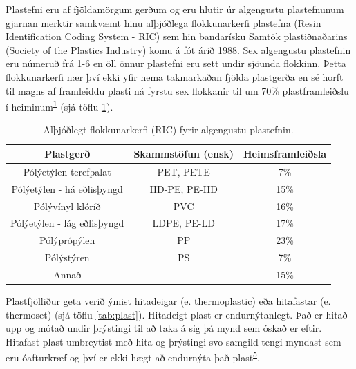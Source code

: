 \documentclass[icelandic,]{book}
\begin{document}
Plastefni eru af fjöldamörgum gerðum og eru hlutir úr algengustu plastefnunum gjarnan merktir samkvæmt hinu alþjóðlega flokkunarkerfi plastefna (Resin Identification Coding System - RIC) sem hin bandarísku Samtök plastiðnaðarins (Society of the Plastics Industry) komu á fót árið 1988. Sex algengustu plastefnin eru númeruð frá 1-6 en öll önnur plastefni eru sett undir sjöunda flokkinn. Þetta flokkunarkerfi nær því ekki yfir nema takmarkaðan fjölda plastgerða en sé horft til magns af framleiddu plasti ná fyrstu sex flokkanir til um 70\% plastframleiðslu í heiminum\textsuperscript{\protect\hyperlink{ref-geyer2017production}{1}} (sjá töflu \ref{tab:framleidsla}).

\begin{table}[t]

\caption{\label{tab:framleidsla}Alþjóðlegt flokkunarkerfi (RIC) fyrir algengustu plastefnin.}
\centering
\begin{tabular}{ccc}
\toprule
Plastgerð & Skammstöfun (ensk) & Heimsframleiðsla\\
\midrule
\rowcolor{gray!6} Pólýetýlen terefþalat & PET, PETE & 7\%\\
Pólýetýlen - há eðlisþyngd & HD-PE, PE-HD & 15\%\\
\rowcolor{gray!6} Pólývínyl klóríð & PVC & 16\%\\
Pólýetýlen - lág eðlisþyngd & LDPE, PE-LD & 17\%\\
\rowcolor{gray!6} Pólýprópýlen & PP & 23\%\\
Pólýstýren & PS & 7\%\\
\rowcolor{gray!6} Annað &  & 15\%\\
\bottomrule
\end{tabular}
\end{table}

Plastfjölliður geta verið ýmist hitadeigar (e. thermoplastic) eða hitafastar (e. thermoset) (sjá töflu \ref{tab:plast}). Hitadeigt plast er endurnýtanlegt. Það er hitað upp og mótað undir þrýstingi til að taka á sig þá mynd sem óskað er eftir. Hitafast plast umbreytist með hita og þrýstingi svo samgild tengi myndast sem eru óafturkræf og því er ekki hægt að endurnýta það plast\textsuperscript{\protect\hyperlink{ref-OECD2009}{5}}.
\end{document}
